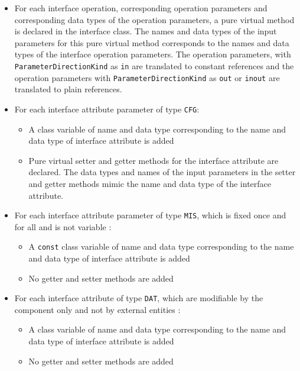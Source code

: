 \begin{itemize}
\item For each interface operation, corresponding operation parameters and corresponding data types of the operation parameters, a pure virtual method is declared in the interface class. The names and data types of the input parameters for this pure virtual method corresponds to the names and data types of the interface operation parameters. The operation parameters, with \texttt{ParameterDirectionKind} as \texttt{in} are translated to constant references and the operation parameters with \texttt{ParameterDirectionKind} as \texttt{out} or \texttt{inout} are translated to plain references. 
\item For each interface attribute parameter of type \texttt{CFG}:
\begin{itemize}
\item A class variable of name and data type corresponding to the name and data type of interface attribute is added
\item Pure virtual setter and getter methods for the interface attribute are declared. The data types and names of the input parameters in the setter and getter methods mimic the name and data type of the interface attribute.
\end{itemize} 
\item For each interface attribute parameter of type \texttt{MIS}, which is fixed once and for all and is not variable \cite{SpecMetamodel}: 
\begin{itemize}
\item A \texttt{const} class variable of name and data type corresponding to the name and data type of interface attribute is added
\item No getter and setter methods are added
\end{itemize}
\item For each interface attribute of type \texttt{DAT}, which are modifiable by the component only and not by external entities \cite{SpecMetamodel}:
\begin{itemize}
\item A class variable of name and data type corresponding to the name and data type of interface attribute is added
\item No getter and setter methods are added  
\end{itemize}   
\end{itemize}


